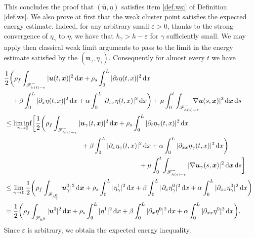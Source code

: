 \documentclass[JEP,XML,SOM,Unicode,NoFloatCountersInSection]{cedram}
\let\mathcal\mathscr
\theoremstyle{remark}
\theoremstyle{definition}
\newcommand{\ug}{\boldsymbol{u}}
\newcommand{\xg}{\boldsymbol{x}}
\newcommand{\dd}{\,\mathrm{d}}
\begin{document}
This concludes the proof that $(\overline{\ug},\eta)$ satisfies item \eqref{def.wsi} of Definition
\ref{def.ws}.
We also prove at first that the weak cluster point
satisfies the expected energy estimate. Indeed, for any arbitrary small $\varepsilon >0$, thanks to the strong convergence of $\eta_{\gamma}$ to $\eta$, we have that $h_{\gamma} > h- \varepsilon$ for $\gamma$ sufficiently small. We may apply then classical weak limit arguments to pass to the limit in the energy estimate satisfied by the $({\ug}_{\gamma},\eta_{\gamma})$. Consequently for almost every $t$ we have
\[
\begin{aligned}
&\frac{1}{2}\biggl(\rho_{f}\int_{\mathcal{F}^{-}_{h(t)-\varepsilon}}\vert\ug(t, \xg) \vert^{2} \dd\xg + \rho_{s}\int_{0}^{L}\vert\partial_{t}\eta(t, x) \vert^{2} \dd x\\
& \quad +\beta\int_{0}^{L}\vert\partial_{x}\eta(t, x) \vert^{2} \dd x+\alpha\int_{0}^{L}\vert\partial_{xx}\eta(t, x) \vert^{2} \dd x\biggr)+ \mu\int_0^t\int_{\mathcal{F}^{-}_{h(s)-\varepsilon}}\hspace*{-5mm}\vert \nabla\ug(s, \xg) \vert^{2} \dd\xg\dd s \\
& \leq
\liminf_{\gamma \to 0} \biggl[ \frac{1}{2}\biggl(\rho_{f}\int_{\mathcal{F}^{-}_{h(t)-\varepsilon}}\vert\ug_{\gamma}(t, \xg) \vert^{2} \dd\xg + \rho_{s}\int_{0}^{L}\vert\partial_{t}\eta_{\gamma}(t, x) \vert^{2} \dd x \\
& \hspace*{4cm} +\beta\int_{0}^{L}\vert\partial_{x}\eta_{\gamma}(t, x) \vert^{2} \dd x +\alpha\int_{0}^{L}\vert\partial_{xx}\eta_{\gamma}(t, x) \vert^{2} \dd x \biggr) \\
& \hspace*{7cm} + \mu\int_0^t\int_{\mathcal{F}^{-}_{h(s)-\varepsilon}}\vert \nabla\ug_{\gamma}(s, \xg) \vert^{2} \dd\xg\dd s\biggr] \\
& \leq \lim_{\gamma \to 0}
\frac{1}{2}\biggl(\rho_{f}\int_{\mathcal{F}_{h^0_{\gamma}}}\vert\ug^0_{\gamma}\vert^{2} \dd \xg+ \rho_{s}\int_{0}^{L}\vert\eta^1_{\gamma}\vert^{2}\dd x+\beta\int_{0}^{L}\vert\partial_{x}\eta^0_{\gamma}\vert^{2}\dd x+\alpha\int_{0}^{L}\vert\partial_{xx}\eta^0_{\gamma}\vert^{2}\dd x\biggr)
\\
&
=\frac{1}{2}\biggl(\rho_{f}\int_{\mathcal{F}_{h^0}}\vert\ug^0\vert^{2} \dd \xg+ \rho_{s}\int_{0}^{L}\vert\eta^1\vert^{2}\dd x +\beta\int_{0}^{L}\vert\partial_{x}\eta^0\vert^{2}\dd x+\alpha\int_{0}^{L}\vert\partial_{xx}\eta^0\vert^{2}\dd x\biggr).
\end{aligned}
\]
Since $\varepsilon$ is arbitrary, we obtain the expected energy inequality.
\end{document}
